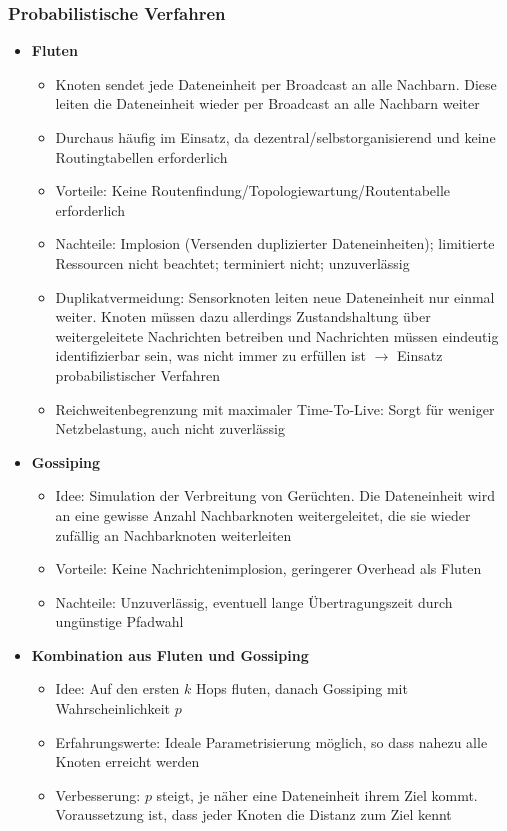 \subsubsection{Probabilistische Verfahren}
\begin{itemize}
	\item \textbf{Fluten}
	\begin{itemize}
		\item Knoten sendet jede Dateneinheit per Broadcast an alle Nachbarn. Diese leiten die Dateneinheit wieder per Broadcast an alle Nachbarn weiter
		\item Durchaus häufig im Einsatz, da dezentral/selbstorganisierend und keine Routingtabellen erforderlich
		\item Vorteile: Keine Routenfindung/Topologiewartung/Routentabelle erforderlich
		\item Nachteile: Implosion (Versenden duplizierter Dateneinheiten); limitierte Ressourcen nicht beachtet; terminiert nicht; unzuverlässig
		\item Duplikatvermeidung: Sensorknoten leiten neue Dateneinheit nur einmal weiter. Knoten müssen dazu allerdings Zustandshaltung über weitergeleitete Nachrichten betreiben und Nachrichten müssen eindeutig identifizierbar sein, was nicht immer zu erfüllen ist \(\rightarrow\) Einsatz probabilistischer Verfahren
		\item Reichweitenbegrenzung mit maximaler Time-To-Live: Sorgt für weniger Netzbelastung, auch nicht zuverlässig
	\end{itemize}
	\item \textbf{Gossiping}
	\begin{itemize}
		\item Idee: Simulation der Verbreitung von Gerüchten. Die Dateneinheit wird an eine gewisse Anzahl Nachbarknoten weitergeleitet, die sie wieder zufällig an Nachbarknoten weiterleiten
		\item Vorteile: Keine Nachrichtenimplosion, geringerer Overhead als Fluten
		\item Nachteile: Unzuverlässig, eventuell lange Übertragungszeit durch ungünstige Pfadwahl
	\end{itemize}
	\item \textbf{Kombination aus Fluten und Gossiping}
	\begin{itemize}
		\item Idee: Auf den ersten \(k\) Hops fluten, danach Gossiping mit Wahrscheinlichkeit \(p\)
		\item Erfahrungswerte: Ideale Parametrisierung möglich, so dass nahezu alle Knoten erreicht werden
		\item Verbesserung: \(p\) steigt, je näher eine Dateneinheit ihrem Ziel kommt. Voraussetzung ist, dass jeder Knoten die Distanz zum Ziel kennt
	\end{itemize}
\end{itemize}

